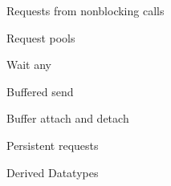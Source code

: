 \documentclass[11pt,headernav]{beamer}
\begin{document}
\begin{numberedframe}{Requests from nonblocking calls}
  
\end{numberedframe}
\begin{numberedframe}{Request pools}
  
\end{numberedframe}
\begin{numberedframe}{Wait any}
  
\end{numberedframe}
\begin{exerciseframe}[setdiff]
  
\end{exerciseframe}

\begin{numberedframe}{Buffered send}
  
\end{numberedframe}
\begin{numberedframe}{Buffer attach and detach}
  
\end{numberedframe}
\begin{numberedframe}{Persistent requests}
  
\end{numberedframe}

 {Derived Datatypes}
\end{document}
